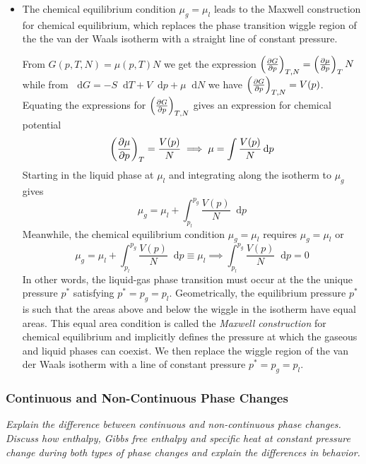 \documentclass[11pt, a4paper]{article}
\newcommand{\diff}{\mathop{}\!\mathrm{d}} %
\newcommand{\pdveval}[3]{\left(\pdv{#1}{#2}\right)_{#3}}
\begin{document}
\begin{itemize}
	\item The chemical equilibrium condition $ \mu_{g} = \mu_{l} $ leads to the Maxwell construction for chemical equilibrium, which replaces the phase transition wiggle region of the the van der Waals isotherm with a straight line of constant pressure. 
	
	
	From $ G(p, T, N) = \mu(p, T)N $ we get the expression $ \pdveval{G}{p}{T, N} = \pdveval{\mu}{p}{T} N $ while from $ \diff G = -S \diff T + V \diff p + \mu \diff N $ we have 	$ \pdveval{G}{p}{T, N} = V(p) $. Equating the expressions for $ \pdveval{G}{p}{T, N} $ gives an expression for chemical potential
	\begin{equation*}
		\pdveval{\mu}{p}{T} = \frac{V(p)}{N} \implies \mu = \int \frac{V(p)}{N} \diff p
	\end{equation*}
	Starting in the liquid phase at $ \mu_{l} $ and integrating along the isotherm to $ \mu_{g} $ gives 
	\begin{equation*}
		\mu_{g} = \mu_{l} + \int_{p_{l}}^{p_{g}} \frac{V(p)}{N}\diff p 
	\end{equation*}
	Meanwhile, the chemical equilibrium condition $ \mu_{g} = \mu_{l}$ requires $ \mu_{g} = \mu_{l} $ or
	\begin{equation*}
		\mu_{g} = \mu_{l} + \int_{p_{l}}^{p_{g}} \frac{V(p)}{N}\diff p  \equiv \mu_{l} \implies  \int_{p_{l}}^{p_{g}} \frac{V(p)}{N}\diff p = 0
	\end{equation*}
	In other words, the liquid-gas phase transition must occur at the the unique pressure $ p^{*} $ satisfying  $ p^{*} = p_{g} = p_{l} $.  Geometrically, the equilibrium pressure $ p^{*} $ is such that the areas above and below the wiggle in the isotherm have equal areas. This equal area condition is called the \textit{Maxwell construction} for chemical equilibrium and implicitly defines the pressure at which the gaseous and liquid phases can coexist. We then replace the wiggle region of the van der Waals isotherm with a line of constant pressure $  p^{*} = p_{g} = p_{l} $.
	 
\end{itemize}

\subsubsection{Continuous and Non-Continuous Phase Changes}
\textit{Explain the difference between continuous and non-continuous phase changes. Discuss how enthalpy, Gibbs free enthalpy and specific heat at constant pressure change during both types of phase changes and explain the differences in behavior.}
\end{document}

